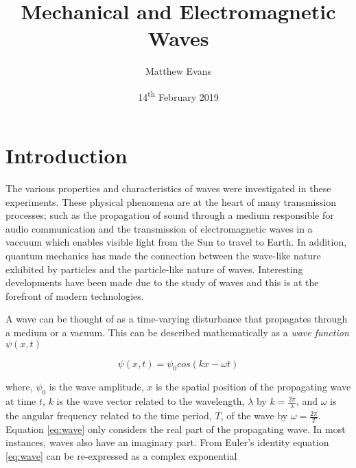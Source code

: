 \documentclass{article}
\begin{document}
\title{Mechanical and Electromagnetic Waves} %
\author{Matthew Evans}%
\date{14\textsuperscript{th} February 2019} %
\maketitle %



\section{Introduction}
\label{sec:introduction}

The various properties and characteristics of waves were investigated in these experiments. These physical phenomena are at the heart of many transmission processes; such as the propagation of sound through a medium responsible for audio communication and the transmission of electromagnetic waves in a vaccuum which enables visible light from the Sun to travel to Earth. In addition, quantum mechanics has made the connection between the wave-like nature exhibited by particles and the particle-like nature of waves. Interesting developments have been made due to the study of waves and this is at the forefront of modern technologies.

\vspace{2mm}
\noindent
A wave can be thought of as a time-varying disturbance that propagates through a medium or a vacuum. This can be described mathematically as a \textit{wave function} $\psi(x, t)$

\begin{equation}
\label{eq:wave}
\psi(x, t) = \psi_0 cos(kx - \omega t)
\end{equation}

\vspace{2mm}
\noindent
where, $\psi_0$ is the wave amplitude, $x$ is the spatial position of the propagating wave at time $t$, $k$ is the wave vector related to the wavelength, $\lambda$ by $k = \frac{2\pi}{\lambda}$, and $\omega$ is the angular frequency related to the time period, $T$, of the wave by $\omega = \frac{2\pi}{T}$. Equation \eqref{eq:wave} only considers the real part of the propagating wave. In most instances, waves also have an imaginary part. From Euler's identity equation \eqref{eq:wave} can be re-expressed as a complex exponential
\end{document}
